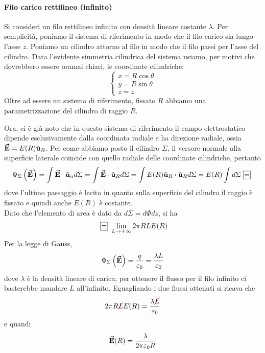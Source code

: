 \paragraph{Filo carico rettilineo (infinito)}
	Si consideri un filo rettilineo infinito con densità lineare costante $\lambda$. Per semplicità, poniamo il sistema di riferimento in modo che il filo carico sia lungo l'asse $z$. Poniamo un cilindro attorno al filo in modo che il filo passi per l'asse del cilindro. Data l'evidente simmetria cilindrica del sistema usiamo, per motivi che dovrebbero essere oramai chiari, le coordinate cilindriche:
\begin{equation*}
	\begin{cases}
		x=R\cos\theta\\
		y=R\sin\theta\\
		z=z
	\end{cases}
\end{equation*}
Oltre ad essere un sistema di riferimento, fissato $R$ abbiamo una parametrizzazione del cilindro di raggio $R$.

Ora, ci è già noto che in questo sistema di riferimento il campo elettrostatico dipende esclusivamente dalla coordinata radiale e ha direzione radiale, ossia $\vb*{\va{E}}=E(R)\hat{\mathbf{u}}_R$. Per come abbiamo posto il cilindro $\Sigma$, il versore normale alla superficie laterale coincide con quello radiale delle coordinate cilindriche, pertanto
\begin{equation*}
	\Phi_{\Sigma}\left(\vba{E}\right)=\int\vba{E}\cdot\vbh{u}_nd\Sigma=\int\vba{E}\cdot\vbh{u}_Rd\Sigma=\int E(R)\vbh{u}_R\vdot\vbh{u}_Rd\Sigma=E(R)\int d\Sigma\squarequal
\end{equation*}
dove l'ultimo passaggio è lecito in quanto sulla superficie del cilindro il raggio è fissato e quindi anche $E(R)$ è costante.\\
Dato che l'elemento di area è dato da $d\Sigma=d\Phi dz$, si ha
\begin{equation*}
	\squarequal\lim_{L\to+\infty}2\pi R L E(R)
\end{equation*}
Per la legge di Gauss,
\begin{equation*}
	\Phi_{\Sigma}\left(\vb*{\va{E}}\right)=\frac{q}{\varepsilon_0}=\frac{\lambda L}{\varepsilon_0}
\end{equation*}
dove $\lambda$ è la densità lineare di carica; per ottenere il flusso per il filo infinito ci basterebbe mandare $L$ all'infinito. Eguagliando i due flussi ottenuti si ricava che
\begin{equation*}
	2\pi R\Ccancel[red]{L}E(R)=\frac{\lambda \Ccancel[red]{L}}{\epsilon_0}
\end{equation*}
e quandi
\begin{equation}
	\vb*{\va{E}}(R)=\frac{\lambda}{2\pi\varepsilon_0 R}
\end{equation}
